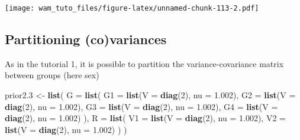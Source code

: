 \documentclass[
  12pt,
]{book}
\newenvironment{Shaded}{\begin{snugshade}}{\end{snugshade}}
\newcommand{\DataTypeTok}[1]{\textcolor[rgb]{0.13,0.29,0.53}{#1}}
\newcommand{\DecValTok}[1]{\textcolor[rgb]{0.00,0.00,0.81}{#1}}
\newcommand{\FloatTok}[1]{\textcolor[rgb]{0.00,0.00,0.81}{#1}}
\newcommand{\KeywordTok}[1]{\textcolor[rgb]{0.13,0.29,0.53}{\textbf{#1}}}
\newcommand{\NormalTok}[1]{#1}
\newcommand{\StringTok}[1]{\textcolor[rgb]{0.31,0.60,0.02}{#1}}
\begin{document}
\texttt{[image: wam\_tuto\_files/figure-latex/unnamed-chunk-113-2.pdf]}

\hypertarget{partitioning-covariances}{%
\subsection{Partitioning (co)variances}\label{partitioning-covariances}}

As in the tutorial 1, it is possible to partition the variance-covariance matrix between groups (here sex)

\begin{Shaded}
\begin{Highlighting}[]
\NormalTok{prior2}\FloatTok{.3}\NormalTok{ \textless{}{-}}\StringTok{ }\KeywordTok{list}\NormalTok{(}
  \DataTypeTok{G =} \KeywordTok{list}\NormalTok{(}
    \DataTypeTok{G1 =} \KeywordTok{list}\NormalTok{(}\DataTypeTok{V =} \KeywordTok{diag}\NormalTok{(}\DecValTok{2}\NormalTok{), }\DataTypeTok{nu =} \FloatTok{1.002}\NormalTok{),}
    \DataTypeTok{G2 =} \KeywordTok{list}\NormalTok{(}\DataTypeTok{V =} \KeywordTok{diag}\NormalTok{(}\DecValTok{2}\NormalTok{), }\DataTypeTok{nu =} \FloatTok{1.002}\NormalTok{),}
    \DataTypeTok{G3 =} \KeywordTok{list}\NormalTok{(}\DataTypeTok{V =} \KeywordTok{diag}\NormalTok{(}\DecValTok{2}\NormalTok{), }\DataTypeTok{nu =} \FloatTok{1.002}\NormalTok{),}
    \DataTypeTok{G4 =} \KeywordTok{list}\NormalTok{(}\DataTypeTok{V =} \KeywordTok{diag}\NormalTok{(}\DecValTok{2}\NormalTok{), }\DataTypeTok{nu =} \FloatTok{1.002}\NormalTok{)}
\NormalTok{  ),}
  \DataTypeTok{R =} \KeywordTok{list}\NormalTok{(}
    \DataTypeTok{V1 =} \KeywordTok{list}\NormalTok{(}\DataTypeTok{V =} \KeywordTok{diag}\NormalTok{(}\DecValTok{2}\NormalTok{), }\DataTypeTok{nu =} \FloatTok{1.002}\NormalTok{),}
    \DataTypeTok{V2 =} \KeywordTok{list}\NormalTok{(}\DataTypeTok{V =} \KeywordTok{diag}\NormalTok{(}\DecValTok{2}\NormalTok{), }\DataTypeTok{nu =} \FloatTok{1.002}\NormalTok{)}
\NormalTok{  )}
\NormalTok{)}


\end{Highlighting}
\end{Shaded}
\end{document}
